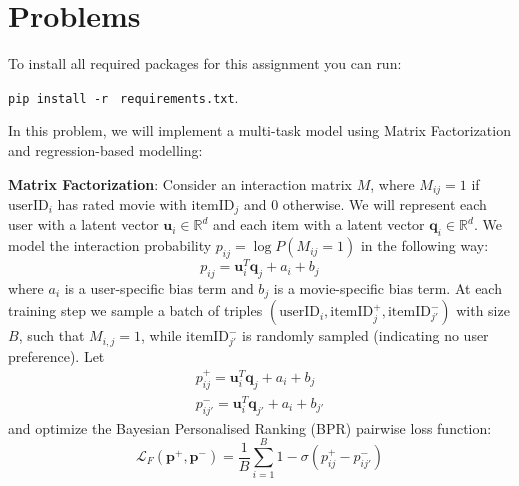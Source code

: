 \documentclass[12pt]{article}
\begin{document}
    
    


\section{Problems}

To install all required packages for this assignment you can run:

\texttt{pip install -r} \texttt{ requirements.txt}.




\noindent In this problem, we will implement a multi-task model using Matrix Factorization \cite{Yehuda2009matrix} and regression-based modelling:

\vspace{0.2cm}

\noindent\textbf{Matrix Factorization}: Consider an interaction matrix $M$, where $M_{ij} = 1$ if $\text{userID}_i$ has rated movie with $\text{itemID}_j$ and $0$ otherwise. We will represent each user with a latent vector $\mathbf{u}_i\in\mathbb{R}^d$ and each item with a latent vector $\mathbf{q}_i\in\mathbb{R}^d$. We model the interaction probability $p_{ij}=\log P(M_{ij}=1)$ in the following way:
\begin{equation}
    p_{ij} = \mathbf{u}_i^T\mathbf{q}_j + a_i + b_j
    \label{eq:prob}
\end{equation}
where $a_i$ is a user-specific bias term and $b_j$ is a movie-specific bias term. At each training step we sample a batch of triples $(\text{userID}_i, \text{itemID}_j^+, \text{itemID}_{j'}^-)$ with size $B$, such that $M_{i, j} = 1$, while $\text{itemID}_{j'}^-$ is randomly sampled (indicating no user preference). Let
\begin{equation} 
\begin{split}
p^+_{ij} =  \mathbf{u}_i^T\mathbf{q}_j + a_i + b_j \\
p^-_{ij'} =  \mathbf{u}_i^T\mathbf{q}_{j'} + a_i + b_{j'}
\end{split}
\label{eq:p}
\end{equation}
and optimize the  Bayesian Personalised Ranking (BPR) \cite{Rendle2009BPR} pairwise loss function:
\begin{equation}
    \mathcal{L}_F(\mathbf{p}^+, \mathbf{p}^-)=\frac{1}{B}\sum_{i=1}^B 1-\sigma(p_{ij}^+-p_{ij'}^-)
    \label{eq:l1}
\end{equation}
\end{document}
